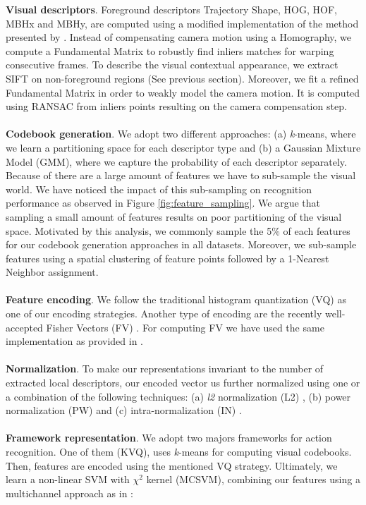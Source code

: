 \textbf{Visual descriptors}. Foreground descriptors \ie Trajectory Shape, HOG, HOF, MBHx and MBHy, are computed using a modified implementation of the method presented by \cite{wang2013}. Instead of compensating camera motion using a Homography, we compute a Fundamental Matrix to robustly find inliers matches for warping consecutive frames. To describe the visual contextual appearance, we extract SIFT \cite{lowe2004} on non-foreground regions (See previous section). Moreover, we fit a refined Fundamental Matrix in order to weakly model the camera motion. It is computed using RANSAC from inliers points resulting on the camera compensation step. \\\\
\textbf{Codebook generation}. We adopt two different approaches: (a) \textit{k}-means, where we learn a partitioning space for each descriptor type and (b) a Gaussian Mixture Model (GMM), where we capture the probability of each descriptor separately. Because of there are a large amount of features we have to sub-sample the visual world. We have noticed the impact of this sub-sampling on recognition performance as observed in Figure \ref{fig:feature_sampling}. We argue that sampling a small amount of features results on poor partitioning of the visual space. Motivated by this analysis, we commonly sample the 5\% of each features for our codebook generation approaches in all datasets. Moreover, we sub-sample features using a spatial clustering of feature points followed by a 1-Nearest Neighbor assignment. \\\\
\textbf{Feature encoding}. We follow the traditional histogram quantization (VQ) as one of our encoding strategies. Another type of encoding are the recently well-accepted Fisher Vectors (FV) \cite{perronnin2010}. For computing FV we have used the same implementation as provided in \cite{perronnin2010}. \\\\
\textbf{Normalization}. To make our representations invariant to the number of extracted local descriptors, our encoded vector us further normalized using one or a combination of the following techniques: (a) \textit{l2} normalization (L2) \cite{perronnin2010}, (b) power normalization (PW) \cite{perronnin2010} and (c) intra-normalization (IN) \cite{xwang2013}. \\\\
\textbf{Framework representation}. We adopt two majors frameworks for action recognition. One of them (KVQ), uses \textit{k}-means for computing visual codebooks. Then, features are encoded using the mentioned VQ strategy. Ultimately, we learn a non-linear SVM with $\chi^2$ kernel (MCSVM), combining our features using a multichannel approach as in \cite{zhang2007}:
